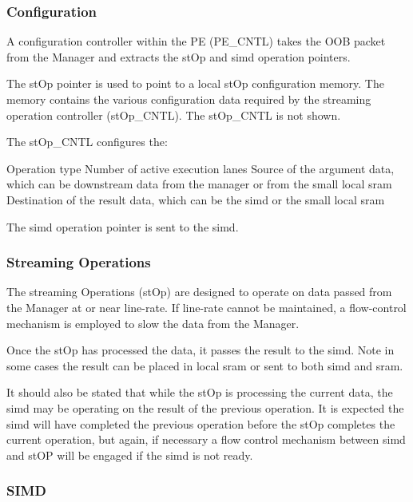 \documentclass[journal]{IEEEtran}
\begin{document}
\subsubsection{Configuration}
\label{ssec:peConfiguration}

A configuration controller within the PE (PE\_CNTL) takes the OOB packet from the Manager and extracts the stOp and \ac{simd} operation pointers.

The stOp pointer is used to point to a local stOp configuration memory. The memory contains the various configuration data required by the streaming operation controller (stOp\_CNTL). The stOp\_CNTL is not shown.

The stOp\_CNTL configures the:

\begin{outline}
    \1 Operation type
    \1 Number of active execution lanes
    \1 Source of the argument data, which can be downstream data from the manager or from the small local \ac{sram}
    \1 Destination of the result data, which can be the \ac{simd} or the small local \ac{sram}
\end{outline}

The \ac{simd} operation pointer is sent to the \ac{simd}.

\subsubsection{Streaming Operations}
\label{ssec:stOps}

The streaming Operations (stOp) are designed to operate on data passed from the Manager at or near line-rate. If line-rate c\ac{ann}ot be maintained, a flow-control mechanism is employed to slow the data from the Manager.

Once the stOp has processed the data, it passes the result to the \ac{simd}. Note in some cases the result can be placed in local \ac{sram} or sent to both \ac{simd} and \ac{sram}.

It should also be stated that while the stOp is processing the current data, the \ac{simd} may be operating on the result of the previous operation. It is expected the \ac{simd} will have completed the previous operation before the stOp completes the current operation, but again, if necessary a flow control mechanism between \ac{simd} and stOP will be engaged if the \ac{simd} is not ready.

\subsubsection{SIMD}
\label{ssec:simd}
\end{document}
